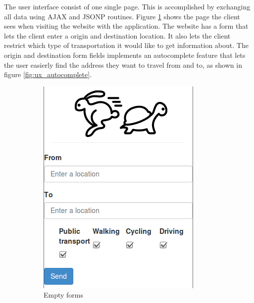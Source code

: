 \documentclass[10pt,a4paper]{article}
\begin{document}
The user interface consist of one single page. This is accomplished by exchanging all data using AJAX and JSONP routines. Figure \ref{fig:ux_empty} shows the page the client sees when visiting the website with the application. The website has a form that lets the client enter a origin and destination location. It also lets the client restrict which type of transportation it would like to get information about. The origin and destination form fields implements an autocomplete feature that lets the user easierly find the address they want to travel from and to, as shown in figure \ref{fig:ux_autocomplete}. \\
\begin{figure}[h]
  \centering
  \begin{subfigure}{0.4\textwidth}
    \includegraphics[width=\textwidth]{../ux/empty}
    \caption{Empty forms}
    \label{fig:ux_empty}    
  \end{subfigure}
\hfill %
  \begin{subfigure}{0.4\textwidth}

\end{subfigure}
\end{figure}
\end{document}
